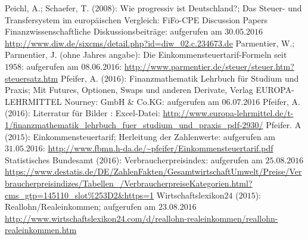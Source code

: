 \begin{thebibliography}{12345678}
	 Peichl, A.; Schaefer, T. ($2008$): Wie progressiv ist Deutschland?; Das Steuer- und Transfersystem im europäischen Vergleich: FiFo-CPE Discussion Papers Finanzwissenschaftliche Diskussionsbeiträge: aufgerufen am $30.05.2016$ \url{http://www.diw.de/sixcms/detail.php?id=diw_02.c.234673.de}
	 Parmentier, W.; Parmentier, J. (ohne Jahres angabe):	
	Die Einkommensteuertarif-Formeln seit $1958$: aufgerufen am $08.06.2016$:
	\url{http://www.parmentier.de/steuer/steuer.htm?steuersatz.htm}   
	 Pfeifer, A. ($2016$): Finanzmathematik Lehrbuch für Studium und Praxis; Mit Futures, Optionen, Swaps und anderen Derivate, Verlag EUROPA-LEHRMITTEL Nourney: GmbH \& Co.KG: aufgerufen am $06.07.2016$ 
	Pfeifer, A. ($2016$): Literratur für  Bilder : Excel-Datei: \url{http://www.europa-lehrmittel.de/t-1/finanzmathematik_lehrbuch_fuer_studium_und_praxis_pdf-2930/}
	  Pfeifer. A ($2015$): Einkommensteuertarif; Herleitung der Zahlenwerte: aufgerufen am $31.05.2016$: \url{http://www.fbmn.h-da.de/~pfeifer/Einkommensteuertarif.pdf}
	 Statistisches Bundesamt ($2016$): Verbraucherpreisindex: aufgerufen am $25.08.2016$ \url{https://www.destatis.de/DE/ZahlenFakten/GesamtwirtschaftUmwelt/Preise/Verbraucherpreisindizes/Tabellen_/VerbraucherpreiseKategorien.html?cms_gtp=145110_slot%253D2&https=1}
	 Wirtschaftslexikon$24$ ($2015$): 	
	Reallohn/Realeinkommen; aufgerufen am $23.08.2016$ \url{http://www.wirtschaftslexikon24.com/d/reallohn-realeinkommen/reallohn-realeinkommen.htm}
\end{thebibliography}
\clearpage